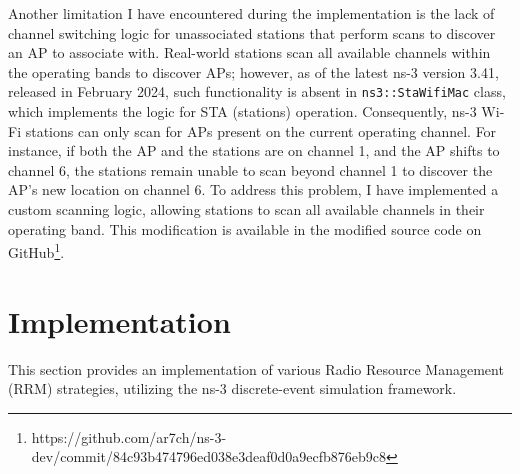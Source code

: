 Another limitation I have encountered during the implementation is the lack of channel switching logic for unassociated stations that perform scans to discover an AP to associate with. Real-world stations scan all available channels within the operating bands to discover APs; however, as of the latest ns-3 version 3.41, released in February 2024, such functionality is absent in \texttt{ns3::StaWifiMac} class, which implements the logic for STA (stations) operation. Consequently, ns-3 Wi-Fi stations can only scan for APs present on the current operating channel. For instance, if both the AP and the stations are on channel 1, and the AP shifts to channel 6, the stations remain unable to scan beyond channel 1 to discover the AP's new location on channel 6. To address this problem, I have implemented a custom scanning logic, allowing stations to scan all available channels in their operating band. This modification is available in the modified source code on GitHub\footnote{https://github.com/ar7ch/ns-3-dev/commit/84c93b474796ed038e3deaf0d0a9ecfb876eb9c8}.


\section{Implementation}
\label{chap:impl:sec:implementation}
This section provides an implementation of various Radio Resource Management (RRM) strategies, utilizing the ns-3 discrete-event simulation framework.


